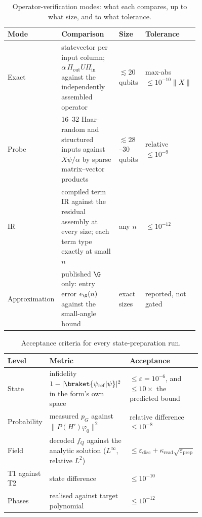 \begin{table}[htbp]
    \centering
    \caption{Operator-verification modes: what each compares, up to what size, and to what tolerance.}
    \label{tab:verification-modes}
    \small
    \begin{tabular}{@{}l p{0.41\linewidth} p{0.14\linewidth} p{0.2\linewidth}@{}}
        \toprule
        Mode & Comparison & Size & Tolerance \\
        \midrule
        Exact & statevector per input column; $\alpha\,\Pi_{\mathrm{out}}U\Pi_{\mathrm{in}}$ against the independently assembled operator & $\lesssim 20$ qubits & max-abs $\le 10^{-10}\|X\|$ \\
        Probe & 16--32 Haar-random and structured inputs against $X\psi/\alpha$ by sparse matrix--vector products & $\lesssim 28$--$30$ qubits & relative $\le 10^{-9}$ \\
        IR & compiled term IR against the residual assembly at every size; each term type exactly at small $n$ & any $n$ & $\le 10^{-12}$ \\
        Approximation & published $\G$ only: entry error $\epsilon_{\G}(n)$ against the small-angle bound & exact sizes & reported, not gated \\
        \bottomrule
    \end{tabular}
\end{table}

\begin{table}[htbp]
    \centering
    \caption{Acceptance criteria for every state-preparation run.}
    \label{tab:acceptance}
    \small
    \begin{tabular}{@{}l p{0.42\linewidth} p{0.34\linewidth}@{}}
        \toprule
        Level & Metric & Acceptance \\
        \midrule
        State & infidelity $1 - |\braket{\psi_{\mathrm{ref}}|\psi}|^2$ in the form's own space & $\le \varepsilon = 10^{-6}$, and $\le 10\times$ the predicted bound \\
        Probability & measured $p_G$ against $\|P(H')\varphi_0\|^2$ & relative difference $\le 10^{-8}$ \\
        Field & decoded $f_Q$ against the analytic solution ($L^\infty$, relative $L^2$) & $\le \varepsilon_{\mathrm{disc}} + \kappa_{\mathrm{read}}\sqrt{\varepsilon_{\mathrm{prep}}}$ \\
        T1 against T2 & state difference & $\le 10^{-10}$ \\
        Phases & realised against target polynomial & $\le 10^{-12}$ \\
        \bottomrule
    \end{tabular}
\end{table}

